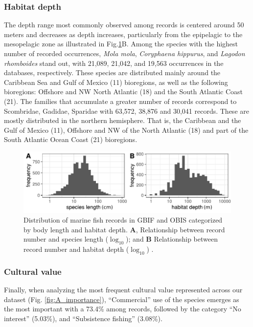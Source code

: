 \documentclass[12pt,authoryear]{elsarticle}
\begin{document}
\subsubsection{Habitat depth}
The depth range most commonly observed among records is centered around 50 meters and decreases as depth increases, particularly from the epipelagic to the mesopelagic zone as illustrated in Fig.\ref{fig:A_depth_size}B. Among the species with the highest number of recorded occurrences, \textit{Mola mola}, \textit{Coryphaena hippurus}, and \textit{Lagodon rhomboides} stand out, with 21,089, 21,042, and 19,563 occurrences in the databases, respectively.
These species are distributed mainly around the Caribbean Sea and Gulf of Mexico (11) bioregions, as well as the following bioregions: Offshore and NW North Atlantic (18) and the South Atlantic Coast (21). The families that accumulate a greater number of records correspond to Scombridae, Gadidae, Sparidae with 63,572, 38,876 and 30,041 records. These are mostly distributed in the northern hemisphere. That is, the Caribbean and the Gulf of Mexico (11), Offshore and NW of the North Atlantic (18) and part of the South Atlantic Ocean Coast (21) bioregions.


\begin{figure}[h]
  \centering
  \includegraphics[width=\textwidth]{Fig_5_new}
  \caption{Distribution of marine fish records in GBIF and OBIS categorized by body length and habitat depth. \textbf{A},  Relationship between record number and species length ($\log_{10}$); and  \textbf{B} Relationship between record number and habitat depth ($\log_{10}$) .}
  \label{fig:A_depth_size}
\end{figure}

\subsubsection{Cultural value}
Finally, when analyzing the most frequent cultural value represented across our dataset (Fig. \ref{fig:A_importance}), ``Commercial'' use of the species emerges as the most important with a 73.4\% among records, followed by the category ``No interest'' (5.03\%), and ``Subsistence fishing'' (3.08\%). 
\end{document}
